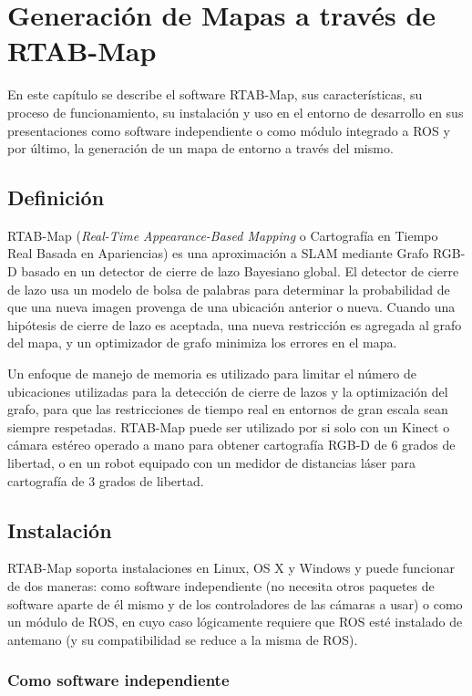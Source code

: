 \chapter{Generación de Mapas a través de RTAB-Map}

En este capítulo se describe el software RTAB-Map, sus características, su proceso de funcionamiento, su instalación y uso en el entorno de desarrollo en sus presentaciones como software independiente o como módulo integrado a ROS y por último, la generación de un mapa de entorno a través del mismo.

\section{Definición}

RTAB-Map (\textit{Real-Time Appearance-Based Mapping} o Cartografía en Tiempo Real Basada en Apariencias) es una aproximación a SLAM mediante Grafo RGB-D basado en un detector de cierre de lazo Bayesiano global. El detector de cierre de lazo usa un modelo de bolsa de palabras para determinar la probabilidad de que una nueva imagen provenga de una ubicación anterior o nueva. Cuando una hipótesis de cierre de lazo es aceptada, una nueva restricción es agregada al grafo del mapa, y un optimizador de grafo minimiza los errores en el mapa.

Un enfoque de manejo de memoria es utilizado para limitar el número de ubicaciones utilizadas para la detección de cierre de lazos y la optimización del grafo, para que las restricciones de tiempo real en entornos de gran escala sean siempre respetadas. RTAB-Map puede ser utilizado por si solo con un Kinect o cámara estéreo operado a mano para obtener cartografía RGB-D de 6 grados de libertad, o en un robot equipado con un medidor de distancias láser para cartografía de 3 grados de libertad. \cite{rtabmaphome}

\section{Instalación}

RTAB-Map soporta instalaciones en Linux, OS X y Windows y puede funcionar de dos maneras: como software independiente (no necesita otros paquetes de software aparte de él mismo y de los controladores de las cámaras a usar) o como un módulo de ROS, en cuyo caso lógicamente requiere que ROS esté instalado de antemano (y su compatibilidad se reduce a la misma de ROS).

\subsection{Como software independiente}

